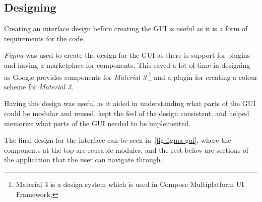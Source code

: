 \documentclass[../dissertation.tex]{subfiles}
\begin{document}
\subsection{Designing}

Creating an interface design before creating the GUI is useful as it is a form of
requirements for the code.

\textit{Figma} was used to create the design for the GUI as there is support for plugins
and having a marketplace for components. This saved a lot of time in designing as
Google provides components for \textit{Material 3}%
\footnote{Material 3 is a design system which is used in Compose Multiplatform UI Framework.}
and a plugin for creating a colour scheme for \textit{Material 3}.

Having this design was useful as it aided in understanding
what parts of the GUI could be modular and reused, kept the feel of the
design consistent, and helped memorize what parts of the GUI needed to be implemented.

The final design for the interface can be seen in~\autoref{fig:figma-gui}, where
the components at the top are reusable modules, and the rest below are sections of
the application that the user can navigate through.
\end{document}
